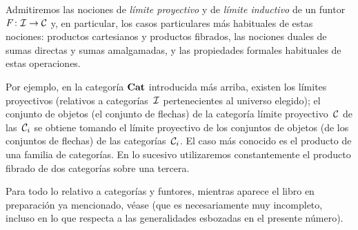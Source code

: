 Admitiremos las nociones de \emph{límite proyectivo} y de \emph{límite
inductivo} de un funtor $F\colon \cal{I}\to \cal{C}$ y, en particular, los
casos particulares más habituales de estas nociones: productos cartesianos y
productos fibrados, las nociones duales de sumas directas y sumas amalgamadas,
y las propiedades formales habituales de estas operaciones.

Por ejemplo, en la categoría $\Cat$ introducida más arriba, existen los límites
proyectivos (relativos a categorías~$\cal{I}$ pertenecientes al universo
elegido); el conjunto de objetos (\resp el conjunto de flechas) de la categoría
límite proyectivo~$\cal{C}$ de las~$\cal{C}_i$ se obtiene tomando el límite
proyectivo de los conjuntos de objetos (\resp de los conjuntos de flechas) de
las categorías~$\cal{C}_i$. El caso más conocido es el producto de una familia
de categorías. En lo sucesivo utilizaremos constantemente el producto fibrado
de dos categorías sobre una tercera.

Para todo lo relativo a categorías y funtores, mientras aparece el libro en
preparación ya mencionado, véase \cite{VI.1} (que es necesariamente muy
incompleto, incluso en lo que respecta a las generalidades esbozadas en el
presente número).


